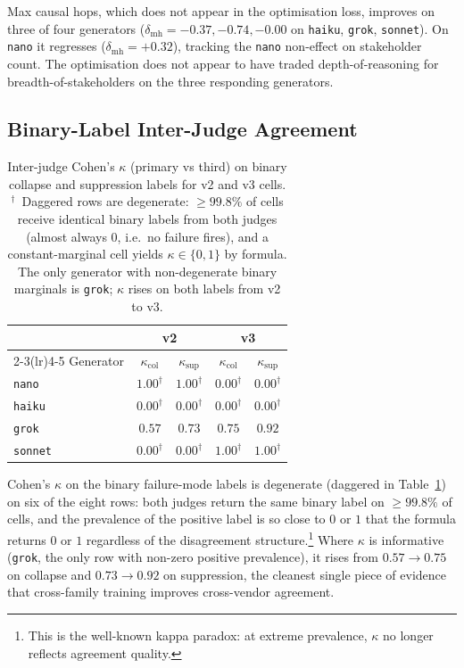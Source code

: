 \documentclass[11pt]{article}
\begin{document}
Max causal hops, which does not appear in the optimisation loss, improves on three of four generators ($\delta_{\text{mh}} = -0.37, -0.74, -0.00$ on \texttt{haiku}, \texttt{grok}, \texttt{sonnet}).
On \texttt{nano} it regresses ($\delta_{\text{mh}} = +0.32$), tracking the \texttt{nano} non-effect on stakeholder count.
The optimisation does not appear to have traded depth-of-reasoning for breadth-of-stakeholders on the three responding generators.

\subsection{Binary-Label Inter-Judge Agreement}
\label{sec:kappa}

\begin{table}[t]
\centering\small
\begin{tabular}{lcccc}
\toprule
& \multicolumn{2}{c}{\textbf{v2}} & \multicolumn{2}{c}{\textbf{v3}} \\
\cmidrule(lr){2-3}\cmidrule(lr){4-5}
Generator & $\kappa_{\text{col}}$ & $\kappa_{\text{sup}}$ & $\kappa_{\text{col}}$ & $\kappa_{\text{sup}}$ \\
\midrule
\texttt{nano}   & $1.00^\dagger$ & $1.00^\dagger$ & $0.00^\dagger$ & $0.00^\dagger$ \\
\texttt{haiku}  & $0.00^\dagger$ & $0.00^\dagger$ & $0.00^\dagger$ & $0.00^\dagger$ \\
\texttt{grok}   & $0.57$ & $0.73$ & $\mathbf{0.75}$ & $\mathbf{0.92}$ \\
\texttt{sonnet} & $0.00^\dagger$ & $0.00^\dagger$ & $1.00^\dagger$ & $1.00^\dagger$ \\
\bottomrule
\end{tabular}
\caption{Inter-judge Cohen's $\kappa$ (primary vs third) on binary collapse and suppression labels for v2 and v3 cells.
$^\dagger$~Daggered rows are degenerate: $\geq 99.8\%$ of cells receive identical binary labels from both judges (almost always $0$, i.e.\ no failure fires), and a constant-marginal cell yields $\kappa \in \{0, 1\}$ by formula.
The only generator with non-degenerate binary marginals is \texttt{grok}; $\kappa$ rises on both labels from v2 to v3.}
\label{tab:kappa}
\end{table}

Cohen's $\kappa$ on the binary failure-mode labels is degenerate (daggered in Table~\ref{tab:kappa}) on six of the eight rows: both judges return the same binary label on $\geq 99.8\%$ of cells, and the prevalence of the positive label is so close to $0$ or $1$ that the formula returns $0$ or $1$ regardless of the disagreement structure.\footnote{This is the well-known kappa paradox: at extreme prevalence, $\kappa$ no longer reflects agreement quality.}
Where $\kappa$ is informative (\texttt{grok}, the only row with non-zero positive prevalence), it rises from $0.57 \to 0.75$ on collapse and $0.73 \to 0.92$ on suppression, the cleanest single piece of evidence that cross-family training improves cross-vendor agreement.
\end{document}
